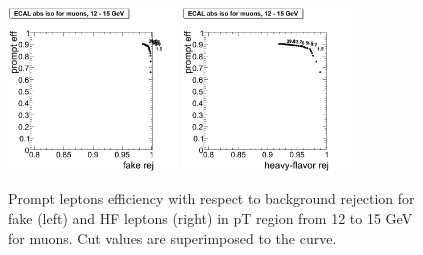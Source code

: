 \begin{figure}[htbp]
\begin{center}
 \includegraphics[width = 0.4\textwidth]{pictures/trackCut/bkgdRej_sigEff/muon_fake_ptCut3_ptCut4.png}
\includegraphics[width = 0.4\textwidth]{pictures/trackCut/bkgdRej_sigEff/muon_nonPrompt_ptCut3_ptCut4.png}
\caption{\small{Prompt leptons efficiency with respect to background 
rejection for fake (left) and HF leptons (right) in pT region
from 12 to 15 GeV for muons. 
Cut values are superimposed to the curve.}\label{fig:ecalrej_mu4}}
\end{center}
\end{figure}

